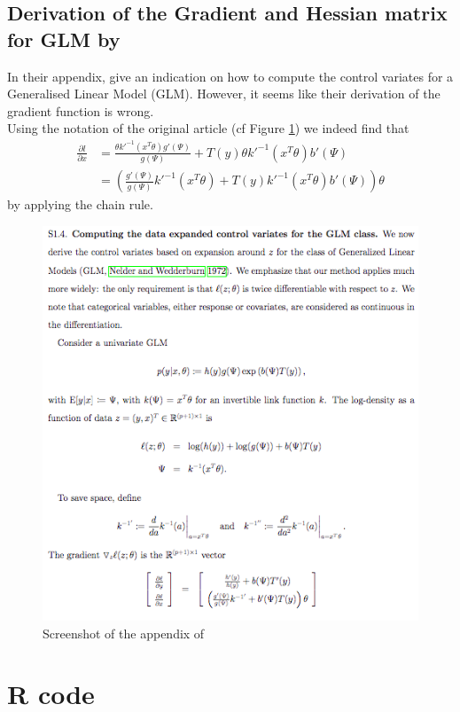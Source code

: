 \documentclass[11pt,a4paper]{report}\usepackage[]{graphicx}\usepackage[]{color}
\begin{document}
\begin{appendix}
\section{Derivation of the Gradient and Hessian matrix for GLM by \cite{quiroz2018speeding}}
In their appendix, \cite{quiroz2018speeding} give an indication on how to compute the control variates for a Generalised Linear Model (GLM). However, it seems like their derivation of the gradient function is wrong.\\
Using the notation of the original article (cf Figure \ref{fig:quirow_appendix}) we indeed find that 
\begin{align}
    \frac{\partial l}{\partial x}&=\frac{\theta k'^{-1}(x^T\theta)g'(\Psi)}{g(\Psi)}+T(y)\theta k'^{-1}(x^T\theta)b'(\Psi)\\
    &=\left(\frac{g'(\Psi)}{g(\Psi)}k'^{-1}(x^T\theta)+T(y) k'^{-1}(x^T\theta)b'(\Psi)\right)\theta
\end{align}
by applying the chain rule.
\begin{figure}
    \centering
    \includegraphics[resolution=100]{proof_quiroz.png}
    \caption{Screenshot of the appendix of \cite{quiroz2018speeding}}
    \label{fig:quirow_appendix}
\end{figure}
\chapter{R code}

\end{appendix}
\end{document}
